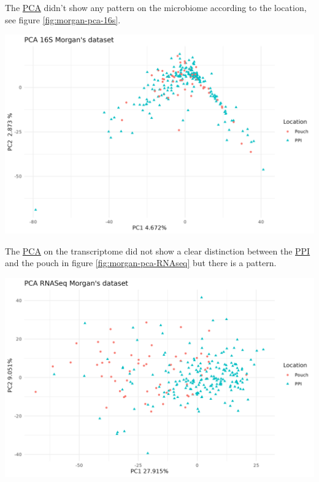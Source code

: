 \documentclass[
  12pt,
  a4paper,
  twoside,
  openright]{book}
\let\origfigure\figure
\let\endorigfigure\endfigure
\renewenvironment{figure}[1][2] {
    \expandafter\origfigure\expandafter[!htbp]
} {
    \endorigfigure
}
\begin{document}
The \protect\hyperlink{acronyms_PCA}{PCA} didn't show any pattern on the microbiome according to the location, see figure \ref{fig:morgan-pca-16s}.

\begin{figure}
\includegraphics[width=1\linewidth]{images/PCA_16S_morgan} \caption[PCA of 16S in the Morgan dataset]{PCA of 16S in the Morgan dataset. There seems to be quite a diverse microbiota based on the first dimension. Each point represents a sample (colored and shaped by location).}\label{fig:morgan-pca-16s}
\end{figure}

The \protect\hyperlink{acronyms_PCA}{PCA} on the transcriptome did not show a clear distinction between the \protect\hyperlink{acronyms_PPI}{PPI} and the pouch in figure \ref{fig:morgan-pca-RNAseq} but there is a pattern.

\begin{figure}
\includegraphics[width=1\linewidth]{images/PCA_RNASeq_morgan} \caption[PCA of RNAseq in the Morgan dataset]{PCA of RNAseq in the Morgan dataset. There is no clear separation of the two locations on the first dimensions of the PCA. Each point represents a sample (colored and shaped by location).}\label{fig:morgan-pca-RNAseq}
\end{figure}
\end{document}
